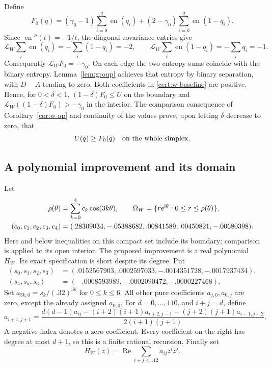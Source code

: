 \documentclass[11pt]{article}
\numberwithin{equation}{section}
\theoremstyle{definition}
\theoremstyle{remark}
\DeclareMathOperator{\en}{en}
\begin{document}
Define
\begin{equation}
 F_0(q)=(\gamma _0-1)\sum_{i=0}^2\en(q_i)
          +(2-\gamma _0)\sum_{i=0}^2\en(1-q_i).
 \label{cert:w-baseline}
\end{equation}
Since $\en''(t)=-1/t$, the diagonal covariance entries give
\[
 \mathcal L_W\sum_i\en(q_i)=-\sum_i(1-q_i)=-2,
 \qquad
 \mathcal L_W\sum_i\en(1-q_i)=-\sum_iq_i=-1.
\]
Consequently $\mathcal L_WF_0=-\gamma _0$.  On each edge the two
entropy sums coincide with the binary entropy.  Lemma~\ref{lem:group}
achieves that entropy by binary separation, with $D-A$ tending to zero.
Both coefficients in \eqref{cert:w-baseline} are positive.  Hence, for
$0<\delta<1$, $(1-\delta)F_0\le U$ on the boundary and
$\mathcal L_W((1-\delta)F_0)>-\gamma _0$ in the interior.
The comparison consequence of Corollary~\ref{cor:w-ap} and continuity of
the values prove, upon letting $\delta$ decrease to zero, that
\begin{equation}
 U(q)\ge F_0(q)\quad\hbox{on the whole simplex}.
 \label{cert:w-baseline-bound}
\end{equation}

\subsection{A polynomial improvement and its domain}

Let
\begin{align}
 \rho(\theta)&=\sum_{k=0}^4c_k\cos(3k\theta),\qquad
 \Omega_W=\{re^{\mathrm i\theta}:0\le r\le\rho(\theta)\},
 \label{cert:w-shell}\\
 (c_0,c_1,c_2,c_3,c_4)
   &=(.28309034,-.05388682,.00841589,.00450821,-.00680398).
 \notag
\end{align}
Here and below inequalities on this compact set include its boundary;
comparison is applied to its open interior.  The proposed improvement is
a real polynomial $H_W$.  Its exact specification is short despite its
degree.  Put
\begin{align*}
 (s_0,s_1,s_2,s_3)
   &=(.0152567903,.0002597033,-.0014351728,-.0017937434),\\
 (s_4,s_5,s_6)&=(-.0008593989,-.0002090472,-.0000227468).
\end{align*}
Set $a_{3k,0}=s_k/(.32)^{3k}$ for $0\le k\le6$.  All other pure
coefficients $a_{j,0},a_{0,j}$ are zero, except the already assigned
$a_{0,0}$.  For $d=0,\ldots,110$, and $i+j=d$, define
\begin{equation}
 a_{i+1,j+1}=
 \frac{d(d-1)a_{ij}-(i+2)(i+1)a_{i+2,j-1}
                      -(j+2)(j+1)a_{i-1,j+2}}
      {2(i+1)(j+1)}.
 \label{cert:w-recurrence}
\end{equation}
A negative index denotes a zero coefficient.  Every coefficient on the
right has degree at most $d+1$, so this is a finite rational recursion.
Finally set
\begin{equation}
 H_W(z)=\operatorname{Re}\sum_{i+j\le112}a_{ij}z^i\bar z^j.
 \label{cert:w-polynomial}
\end{equation}
\end{document}
